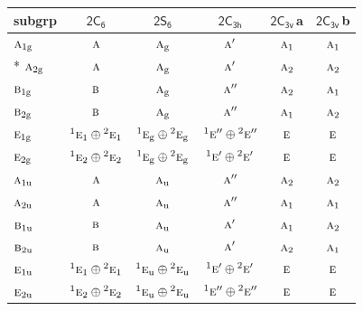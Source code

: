 \documentclass[10pt,a4paper]{article}
\numberwithin{equation}{section}
\newcommand{\grp}[1]{\mathsf{#1}}
\newcommand{\irr}[1]{\text{\normalfont\scshape #1}}
\newcommand{\conjpair}[1]{{}^{#1}}
\newcommand{\ptag}[1]{\mathrm{#1}}
\newcommand{\clsletter}[1]{\,{\scriptsize\color{black!55}#1}}
\begin{document}
{\small\begin{longtable}{@{}lccccc@{}}\toprule
subgrp & \href{2C6.pdf}{$\grp{2C_{6}}$} & \href{2S6.pdf}{$\grp{2S_{6}}$} & \href{2C3h.pdf}{$\grp{2C_{3h}}$} & \href{2C3v.pdf}{$\grp{2C_{3v}}$}\clsletter{a} & \href{2C3v.pdf}{$\grp{2C_{3v}}$}\clsletter{b}\\\midrule\endhead
\bottomrule\endfoot\endlastfoot
$\irr{a}_{1\ptag{g}}$ & $\irr{a}$ & $\irr{a}_{\ptag{g}}$ & $\irr{a}'$ & $\irr{a}_{1}$ & $\irr{a}_{1}$\\*
$\irr{a}_{2\ptag{g}}$ & $\irr{a}$ & $\irr{a}_{\ptag{g}}$ & $\irr{a}'$ & $\irr{a}_{2}$ & $\irr{a}_{2}$\\
$\irr{b}_{1\ptag{g}}$ & $\irr{b}$ & $\irr{a}_{\ptag{g}}$ & $\irr{a}''$ & $\irr{a}_{2}$ & $\irr{a}_{1}$\\
$\irr{b}_{2\ptag{g}}$ & $\irr{b}$ & $\irr{a}_{\ptag{g}}$ & $\irr{a}''$ & $\irr{a}_{1}$ & $\irr{a}_{2}$\\
$\irr{e}_{1\ptag{g}}$ & $\conjpair{1}\irr{e}_{1}\oplus \conjpair{2}\irr{e}_{1}$ & $\conjpair{1}\irr{e}_{\ptag{g}}\oplus \conjpair{2}\irr{e}_{\ptag{g}}$ & $\conjpair{1}\irr{e}''\oplus \conjpair{2}\irr{e}''$ & $\irr{e}$ & $\irr{e}$\\
$\irr{e}_{2\ptag{g}}$ & $\conjpair{1}\irr{e}_{2}\oplus \conjpair{2}\irr{e}_{2}$ & $\conjpair{1}\irr{e}_{\ptag{g}}\oplus \conjpair{2}\irr{e}_{\ptag{g}}$ & $\conjpair{1}\irr{e}'\oplus \conjpair{2}\irr{e}'$ & $\irr{e}$ & $\irr{e}$\\
$\irr{a}_{1\ptag{u}}$ & $\irr{a}$ & $\irr{a}_{\ptag{u}}$ & $\irr{a}''$ & $\irr{a}_{2}$ & $\irr{a}_{2}$\\
$\irr{a}_{2\ptag{u}}$ & $\irr{a}$ & $\irr{a}_{\ptag{u}}$ & $\irr{a}''$ & $\irr{a}_{1}$ & $\irr{a}_{1}$\\
$\irr{b}_{1\ptag{u}}$ & $\irr{b}$ & $\irr{a}_{\ptag{u}}$ & $\irr{a}'$ & $\irr{a}_{1}$ & $\irr{a}_{2}$\\
$\irr{b}_{2\ptag{u}}$ & $\irr{b}$ & $\irr{a}_{\ptag{u}}$ & $\irr{a}'$ & $\irr{a}_{2}$ & $\irr{a}_{1}$\\
$\irr{e}_{1\ptag{u}}$ & $\conjpair{1}\irr{e}_{1}\oplus \conjpair{2}\irr{e}_{1}$ & $\conjpair{1}\irr{e}_{\ptag{u}}\oplus \conjpair{2}\irr{e}_{\ptag{u}}$ & $\conjpair{1}\irr{e}'\oplus \conjpair{2}\irr{e}'$ & $\irr{e}$ & $\irr{e}$\\
$\irr{e}_{2\ptag{u}}$ & $\conjpair{1}\irr{e}_{2}\oplus \conjpair{2}\irr{e}_{2}$ & $\conjpair{1}\irr{e}_{\ptag{u}}\oplus \conjpair{2}\irr{e}_{\ptag{u}}$ & $\conjpair{1}\irr{e}''\oplus \conjpair{2}\irr{e}''$ & $\irr{e}$ & $\irr{e}$\\

\end{longtable}}
\end{document}
